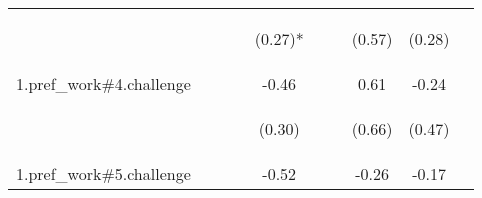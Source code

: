 \begin{center}
\begin{tabular}{lccccccccc}
 & \begin{footnotesize}\end{footnotesize} & \begin{footnotesize}\end{footnotesize} & \begin{footnotesize}\end{footnotesize} & \begin{footnotesize}(0.27)*\end{footnotesize} & \begin{footnotesize}\end{footnotesize} & \begin{footnotesize}\end{footnotesize} & \begin{footnotesize}(0.57)\end{footnotesize} & \begin{footnotesize}(0.28)\end{footnotesize} & \begin{footnotesize}\end{footnotesize}\\
\noalign{\smallskip}1.pref_work\#4.challenge &  &  &  & -0.46 &  &  & 0.61 & -0.24 & \\
 & \begin{footnotesize}\end{footnotesize} & \begin{footnotesize}\end{footnotesize} & \begin{footnotesize}\end{footnotesize} & \begin{footnotesize}(0.30)\end{footnotesize} & \begin{footnotesize}\end{footnotesize} & \begin{footnotesize}\end{footnotesize} & \begin{footnotesize}(0.66)\end{footnotesize} & \begin{footnotesize}(0.47)\end{footnotesize} & \begin{footnotesize}\end{footnotesize}\\
\noalign{\smallskip}1.pref_work\#5.challenge &  &  &  & -0.52 &  &  & -0.26 & -0.17 & \\

\end{tabular}
\end{center}
